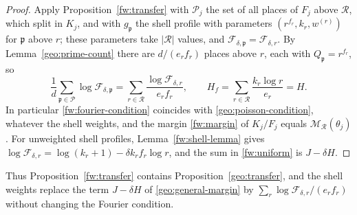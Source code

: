 \begin{proof}
Apply Proposition~\ref{fw:transfer} with $\mathcal P_j$ the set of all
places of $F_j$ above $\mathcal R$, which split in $K_j$, and with
$g_{\mathfrak p}$ the shell profile with parameters
$(r^{f_r},k_r,w^{(r)})$ for $\mathfrak p$ above $r$; these parameters
take $|\mathcal R|$ values, and $\mathcal F_{\delta,\mathfrak
p}=\mathcal F_{\delta,r}$. By Lemma~\ref{geo:prime-count} there are $d/(e_rf_r)$
places above $r$, each with $Q_{\mathfrak p}=r^{f_r}$, so
\begin{equation}\label{fw:uniform}
 \frac1d\sum_{\mathfrak p\in\mathcal P}\log\mathcal F_{\delta,\mathfrak p}
 =\sum_{r\in\mathcal R}\frac{\log\mathcal F_{\delta,r}}{e_rf_r},
 \qquad
 H_f=\sum_{r\in\mathcal R}\frac{k_r\log r}{e_r}=H .
\end{equation}
In particular \eqref{fw:fourier-condition} coincides with
\eqref{geo:poisson-condition}, whatever the shell weights, and the
margin \eqref{fw:margin} of $K_j/F_j$ equals $\mathcal M_{\mathcal
R}(\theta_j)$. For unweighted shell profiles, Lemma~\ref{fw:shell-lemma}
gives $\log\mathcal F_{\delta,r}=\log(k_r+1)-\delta k_rf_r\log r$, and the
sum in \eqref{fw:uniform} is $J-\delta H$.
\end{proof}

Thus Proposition~\ref{fw:transfer} contains
Proposition~\ref{geo:transfer}, and the shell weights replace the term
$J-\delta H$ of \eqref{geo:general-margin} by
$\sum_r\log\mathcal F_{\delta,r}/(e_rf_r)$ without changing the Fourier
condition.
